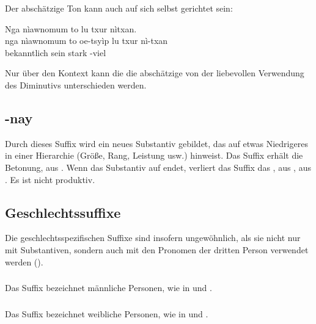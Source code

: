 Der abschätzige Ton kann auch auf sich selbst gerichtet sein: 

\begin{interlin}
	\glll \Npawl{}Nga nìawnomum to  lu txur nìtxan. \\
	nga nìawnomum to oe-tsyìp lu txur nì-txan \\
	 bekanntlich   sein stark -viel \\
\end{interlin}

\noindent Nur über den Kontext kann die die abschätzige von der liebevollen Verwendung des Diminutivs unterschieden werden.

\subsection{-nay} Durch dieses Suffix wird ein neues Substantiv gebildet, das auf etwas Niedrigeres in einer Hierarchie (Größe, Rang, Leistung usw.) hinweist. Das Suffix erhält die Betonung,   aus  . Wenn das Substantiv auf  endet, verliert das Suffix das ,   aus  ,   aus  . Es ist nicht produktiv.

\subsection{Geschlechtssuffixe} Die geschlechtsspezifischen Suffixe sind insofern ungewöhnlich, als sie nicht nur mit Substantiven, sondern auch mit den Pronomen der dritten Person verwendet werden ().\label{lingop:suffix:gender}

\subsubsection{} Das Suffix  bezeichnet männliche Personen, wie in   und  .

\subsubsection{} Das Suffix  bezeichnet weibliche Personen, wie in   und  .

